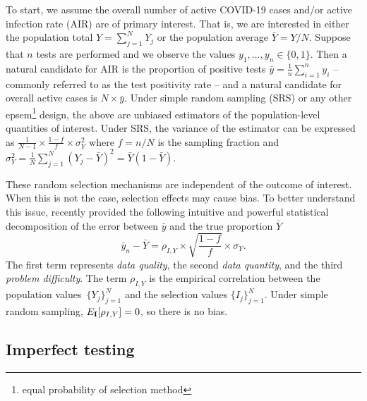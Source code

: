 \documentclass[11pt]{amsart}
\numberwithin{equation}{section}
\theoremstyle{plain}
\def\I{\bf I}
\begin{document}
 To start, we assume the overall number of active COVID-19 cases and/or active infection rate (AIR) are of primary interest. That is, we are interested in either the population total $Y = \sum_{j=1}^N Y_j$ or the population average $\bar Y = Y/N$. Suppose that $n$ tests are performed and we observe the values $y_1, \ldots, y_n \in \{0,1\}$.  Then a natural candidate for AIR is the proportion of positive tests $\bar y = \frac{1}{n} \sum_{i=1}^n y_i$ -- commonly referred to as the test positivity rate -- and a natural candidate for overall active cases is $N \times \bar y$.
 Under simple random sampling (SRS) or any other epsem\footnote{equal probability of selection method} design, the above are unbiased estimators of the population-level quantities of interest.  Under SRS, the variance of the estimator can be expressed as $\frac{1}{N-1} \times \frac{1-f}{f} \times \sigma_Y^2$ where $f = n/N$ is the sampling fraction and $\sigma_Y^2 = \frac{1}{N} \sum_{j=1}^N (Y_j - \bar Y)^2 = \bar Y (1- \bar Y)$.

 These random selection mechanisms are independent of the outcome of interest. When this is not the case, selection effects may cause bias. To better understand this issue, \cite{Meng2018} recently provided the following intuitive and powerful statistical decomposition of the error between $\bar y$ and the true proportion $\bar Y$
 $$
 \bar y_n - \bar Y =  \rho_{I, Y} \times \sqrt{\frac{1-f}{f}} \times \sigma_Y.
 $$
 The first term represents \emph{data quality}, the second \emph{data quantity}, and the third \emph{problem difficulty}. The term $\rho_{I,Y}$ is the empirical correlation between the population values~$\{ Y_j \}_{j=1}^N$ and the selection values $\{ I_j \}_{j=1}^N$.  Under simple random sampling, $E_{\I} [ \rho_{I,Y} ] = 0$,
 so there is no bias.


 \subsection{Imperfect testing}
 \label{section:imperfecttesting}
\end{document}
